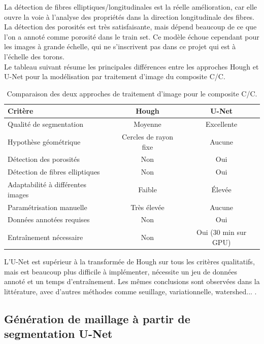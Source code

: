 \documentclass[a4paper,11pt]{article}
\begin{document}
La détection de fibres elliptiques/longitudinales est la réelle amélioration, car elle ouvre la voie à l'analyse des propriétés dans la direction longitudinale des fibres. La détection des porosités est très satisfaisante, mais dépend beaucoup de ce que l'on a annoté comme porosité dans le train set. Ce modèle échoue cependant pour les images à grande échelle, qui ne s'inscrivent pas dans ce projet qui est à l'échelle des torons. \\
Le tableau suivant résume les principales différences entre les approches Hough et U-Net pour la modélisation par traitement d'image du composite C/C.
\begin{table}[H]
    \centering
    \caption{Comparaison des deux approches de traitement d'image pour le composite C/C.}
    \label{tab:comparaison_methodes}
    \begin{tabular}{lcc}
        \toprule
        \textbf{Critère} & \textbf{Hough} & \textbf{U-Net} \\
        \midrule
        Qualité de segmentation & Moyenne & Excellente \\
        Hypothèse géométrique & Cercles de rayon fixe & Aucune \\
        Détection des porosités & Non & Oui \\
        Détection de fibres elliptiques & Non & Oui \\
        Adaptabilité à différentes images & Faible & Élevée \\
        Paramétrisation manuelle & Très élevée & Aucune \\
        Données annotées requises & Non & Oui \\
        Entraînement nécessaire & Non & Oui (30 min sur GPU) \\
        \bottomrule
    \end{tabular}
\end{table}

L'U-Net est supérieur à la transformée de Hough sur tous les critères qualitatifs, mais est beaucoup plus difficile à implémenter, nécessite un jeu de données annoté et un temps d'entraînement. Les mêmes conclusions sont observées dans la littérature, avec d'autres méthodes comme seuillage, variationnelle, watershed... \cite{HeMultiscale}.
\subsection{Génération de maillage à partir de segmentation U-Net}
\label{subsubsec:maillage_unet}
\end{document}

